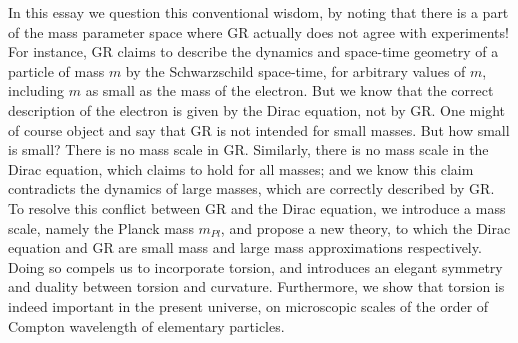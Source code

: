\documentclass[prd, preprint, 12pt]{revtex4-1}
\begin{document}
In this essay we question this conventional wisdom, by noting that there is a part of the mass parameter space where GR actually does not agree with experiments! For instance, GR claims to describe the dynamics and  space-time geometry of a particle of mass $m$ by the Schwarzschild space-time, for arbitrary values of $m$, including $m$ as small as the mass of the electron. But we know that the correct description of the electron is given by the Dirac equation, not by GR. One might of course object and say that GR is not intended for small masses. But how small is small? There is no mass scale in GR. Similarly, there is no mass scale in the Dirac equation, which claims to hold for all masses; and we know this claim contradicts the dynamics of large masses, which are correctly described by GR. To resolve this conflict between  GR and the Dirac equation, we introduce a mass scale, namely the Planck mass $m_{Pl}$, and propose a new theory, to which the Dirac equation and GR are small mass and large mass approximations respectively. Doing so compels us to incorporate torsion, and introduces an elegant symmetry and duality between torsion and curvature. Furthermore, we show that torsion is indeed important in the present universe, on microscopic scales of the order of Compton wavelength of elementary particles. 
\end{document}
